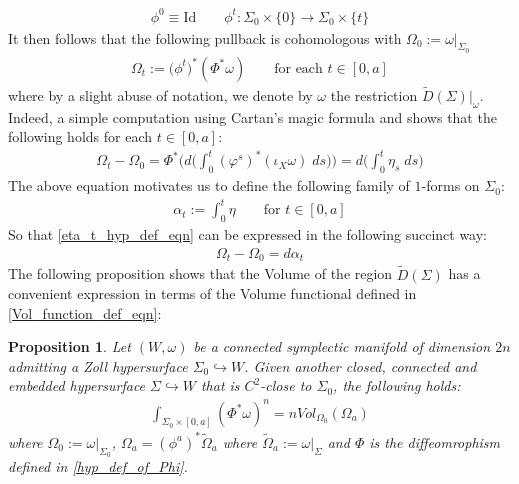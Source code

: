 \documentclass[11pt]{amsart}
\theoremstyle{plain}
\newtheorem{proposition}[theorem]{Proposition}
\theoremstyle{definition}
\theoremstyle{remark}
\begin{document}
\begin{align}
    \phi^0\equiv \text{Id} \qquad \phi^t: \Sigma_0 \times\{0\} \rightarrow \Sigma_0\times \{t\}
\end{align}
It then follows that the following pullback is cohomologous with $\Omega_0:= \omega\big\vert_{\Sigma_0}$
\begin{align}
    \Omega_t:= \big(\phi^t\big)^*(\Phi^*\omega) \qquad \text{for each $t \in [0,a]$}
\end{align}
where by a slight abuse of notation, we denote by $\omega$ the restriction $\tilde D(\Sigma)\big\vert_{\omega}$. Indeed, a simple computation using Cartan's magic formula and \cite[Lemma 2.2.1]{ Geiges_book} shows that the following holds for each $t \in [0,a]$:
\begin{align}\label{eta_t_hyp_def_eqn}
    \Omega_t -\Omega_0 = \Phi^*\bigg( d\Big(\int^t_0 (\varphi^s)^* (\iota_{X} \omega) \; ds\Big)\bigg) = d\Big(\int^t_0 \eta_s \;ds\Big)
\end{align}
The above equation motivates us to define the following family of $1$-forms on $\Sigma_0$:
\begin{align}
   \alpha_t:= \int^t_0 \eta  \qquad \text{for $t \in [0,a]$}
\end{align}
So that \eqref{eta_t_hyp_def_eqn} can be expressed in the following succinct way:
\begin{align}
    \Omega_t -\Omega_0 = d\alpha_t
\end{align}
The following proposition shows that the Volume of the region $\tilde D(\Sigma)$ has a convenient expression in terms of the Volume functional defined in \eqref{Vol_function_def_eqn}:
\begin{proposition}\label{hyp_vol_prop}
    Let $(W,\omega)$ be a connected symplectic manifold of dimension $2n$ admitting a Zoll hypersurface $\Sigma_0 \hookrightarrow W$. Given another closed, connected and embedded hypersurface $\Sigma \hookrightarrow W$ that is $C^2$-close to $\Sigma_0$, the following holds:
    \begin{align}
        \int_{\Sigma_0 \times [0,a]} (\Phi^*\omega)^n =  nVol_{\Omega_0}(\Omega_a)
    \end{align}
    where $\Omega_0:= \omega\vert_{\Sigma_0}$, $\Omega_a = (\phi^a)^*\tilde \Omega_a$ where $\tilde \Omega_a:= \omega\vert_{\Sigma}$ and $\Phi$ is the diffeomrophism defined in \eqref{hyp_def_of_Phi}.
\end{proposition}
\end{document}
